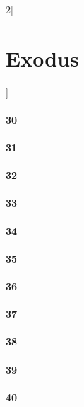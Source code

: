 \documentclass{book}
\begin{document}
\begin{multicols}{2}[\part{Exodus}]
\subsection*{30}
\subsection*{31}
\subsection*{32}
\subsection*{33}
\subsection*{34}
\subsection*{35}
\subsection*{36}
\subsection*{37}
\subsection*{38}
\subsection*{39}
\subsection*{40}
\end{multicols}
\end{document}
